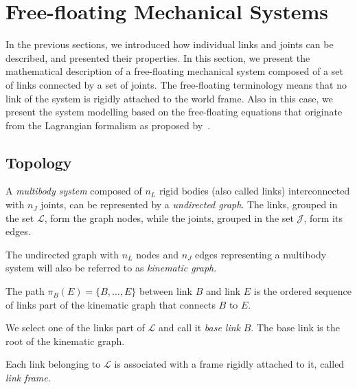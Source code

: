 \section{Free-floating Mechanical Systems}
\label{section:free-floating_mechanical_systems}

In the previous sections, we introduced how individual links and joints can be described, and presented their properties.
In this section, we present the mathematical description of a free-floating mechanical system composed of a set of links connected by a set of joints.
The free-floating terminology means that no link of the system is rigidly attached to the world frame.
Also in this case, we present the system modelling based on the free-floating equations that originate from the Lagrangian formalism as proposed by~\textcite[Chapter~3]{traversaro_modelling_2017}.

\subsection{Topology}
\label{sec:multibody_topology}

\begin{definition*}
%
A \emph{multibody system} composed of $n_L$ rigid bodies (also called links) interconnected with $n_J$ joints, can be represented by a \emph{undirected graph}.
The links, grouped in the set $\mathcal{L}$, form the graph nodes, while the joints, grouped in the set $\mathcal{J}$, form its edges.
%
\end{definition*}

\begin{definition*}
%
The undirected graph with $n_L$ nodes and $n_J$ edges representing a multibody system will also be referred to as \emph{kinematic graph}.
%
\end{definition*}

\begin{definition*}[Path]
%
The path $\pi_B(E) = \{B, \dots, E\}$ between link $B$ and link $E$ is the ordered sequence of links part of the kinematic graph that connects $B$ to $E$.
%
\end{definition*}

\begin{definition*}
%
We select one of the links part of $\mathcal{L}$ and call it \emph{base link} $B$.
The base link is the root of the kinematic graph.
%
\end{definition*}

\begin{assumption*}
%
Each link belonging to $\mathcal{L}$ is associated with a frame rigidly attached to it, called \emph{link frame}.
%
\end{assumption*}

